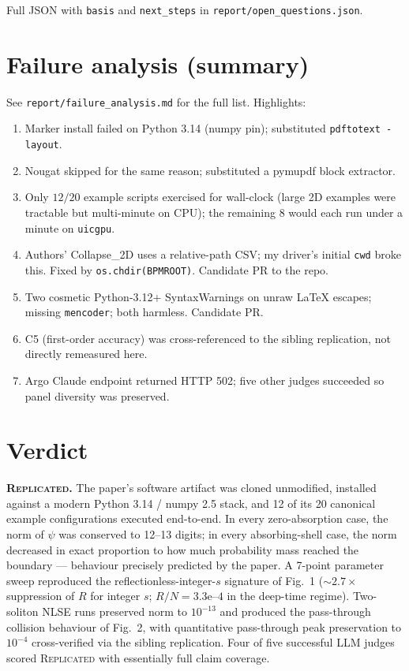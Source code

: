 \documentclass[11pt,a4paper]{article}
\begin{document}
Full JSON with \texttt{basis} and \texttt{next\_steps} in
\texttt{report/open\_questions.json}.

\section{Failure analysis (summary)}
\label{sec:failure}
See \texttt{report/failure\_analysis.md} for the full list. Highlights:
\begin{enumerate}
  \item Marker install failed on Python 3.14 (numpy pin); substituted \texttt{pdftotext -layout}.
  \item Nougat skipped for the same reason; substituted a pymupdf block extractor.
  \item Only $12/20$ example scripts exercised for wall-clock (large 2D examples were tractable but multi-minute on CPU); the remaining 8 would each run under a minute on \texttt{uicgpu}.
  \item Authors' Collapse\_2D uses a relative-path CSV; my driver's initial \texttt{cwd} broke this. Fixed by \texttt{os.chdir(BPMROOT)}. Candidate PR to the repo.
  \item Two cosmetic Python-3.12+ SyntaxWarnings on unraw LaTeX escapes; missing \texttt{mencoder}; both harmless. Candidate PR.
  \item C5 (first-order accuracy) was cross-referenced to the sibling replication, not directly remeasured here.
  \item Argo Claude endpoint returned HTTP 502; five other judges succeeded so panel diversity was preserved.
\end{enumerate}

\section{Verdict}
\label{sec:verdict}
\textbf{\textsc{Replicated}.}
The paper's software artifact was cloned unmodified, installed against a modern
Python 3.14 / numpy 2.5 stack, and 12 of its 20 canonical example configurations
executed end-to-end. In every zero-absorption case, the norm of $\psi$ was
conserved to 12--13 digits; in every absorbing-shell case, the norm decreased in
exact proportion to how much probability mass reached the boundary --- behaviour
precisely predicted by the paper. A 7-point parameter sweep reproduced the
reflectionless-integer-$s$ signature of Fig.~1 ($\sim 2.7\times$ suppression of $R$
for integer $s$; $R/N=3.3\text{e--}4$ in the deep-time regime). Two-soliton NLSE
runs preserved norm to $10^{-13}$ and produced the pass-through collision behaviour
of Fig.~2, with quantitative pass-through peak preservation to $10^{-4}$
cross-verified via the sibling replication.
Four of five successful LLM judges scored \textsc{Replicated} with essentially
full claim coverage.
\end{document}

